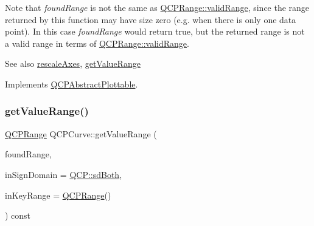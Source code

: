 Note that {\itshape found\+Range} is not the same as \hyperlink{classQCPRange_ab38bd4841c77c7bb86c9eea0f142dcc0}{Q\+C\+P\+Range\+::valid\+Range}, since the range returned by this function may have size zero (e.\+g. when there is only one data point). In this case {\itshape found\+Range} would return true, but the returned range is not a valid range in terms of \hyperlink{classQCPRange_ab38bd4841c77c7bb86c9eea0f142dcc0}{Q\+C\+P\+Range\+::valid\+Range}.

\begin{DoxySeeAlso}{See also}
\hyperlink{classQCPAbstractPlottable_a1491c4a606bccd2d09e65e11b79eb882}{rescale\+Axes}, \hyperlink{classQCPCurve_a8bb8e3b9085f15921dc40483fb025ab2}{get\+Value\+Range} 
\end{DoxySeeAlso}


Implements \hyperlink{classQCPAbstractPlottable_a4da16d3cd4b509e1104a9b0275623c96}{Q\+C\+P\+Abstract\+Plottable}.

\mbox{\label{classQCPCurve_a8bb8e3b9085f15921dc40483fb025ab2}} 
\subsubsection{\texorpdfstring{get\+Value\+Range()}{getValueRange()}}
{\footnotesize\ttfamily \hyperlink{classQCPRange}{Q\+C\+P\+Range} Q\+C\+P\+Curve\+::get\+Value\+Range (\begin{DoxyParamCaption}\item[{bool \&}]{found\+Range,  }\item[{\hyperlink{namespaceQCP_afd50e7cf431af385614987d8553ff8a9}{Q\+C\+P\+::\+Sign\+Domain}}]{in\+Sign\+Domain = {\ttfamily \hyperlink{namespaceQCP_afd50e7cf431af385614987d8553ff8a9aa38352ef02d51ddfa4399d9551566e24}{Q\+C\+P\+::sd\+Both}},  }\item[{const \hyperlink{classQCPRange}{Q\+C\+P\+Range} \&}]{in\+Key\+Range = {\ttfamily \hyperlink{classQCPRange}{Q\+C\+P\+Range}()} }\end{DoxyParamCaption}) const\hspace{0.3cm}{\ttfamily [virtual]}}


